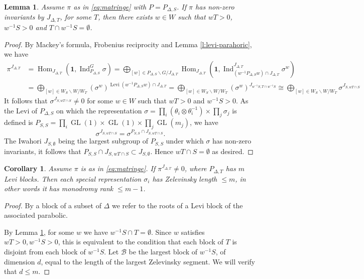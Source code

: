 \documentclass{amsart}
\newtheorem{lemma}[thm]{Lemma}
\newtheorem{corollary}[thm]{Corollary}
\theoremstyle{definition}
\newcommand{\Hom}{\operatorname{Hom}}
\newcommand{\Ind}{\operatorname{Ind}}
\newcommand{\GL}{\operatorname{GL}}
\begin{document}
{\begin{lemma}\label{l:parahoric-condition}
Assume  $\pi$ as in \eqref{eq:matringe} with $P=P_{\Delta,S}$. 
If $\pi$ has non-zero invariants by  $J_{\Delta,T}$, for some $T$, then there exists   $w\in W$ such that $w T>0$,  $w^{-1}S>0$ and
$T\cap w^{-1}S=\emptyset$.  
\end{lemma}
\begin{proof}
By Mackey's formula, Frobenius reciprocity and Lemma \ref{l:levi-parahoric}, we have 
\begin{align*}
\pi^{J_{\Delta,T}}&=\Hom_{J_{\Delta,T}}(\mathbf{1}, \Ind_{P_{\Delta,S}}^G  \sigma)=
\bigoplus_{[w]\in P_{\Delta,S}\backslash G/J_{\Delta,T}} \Hom_{J_{\Delta,T}}(\mathbf{1}, \Ind_{(w^{-1}P_{\Delta,S}w)\cap J_{\Delta,T}}^{J_{\Delta,T}}\sigma^w)\\
  &=\bigoplus_{[w]\in W_S\backslash    W/W_T}(\sigma^w)^{\operatorname{Levi}(w^{-1}P_{\Delta,S}w)\cap
    J_{\Delta,T}}=\bigoplus_{[w]\in W_S\backslash    W/W_T}(\sigma^w)^{J_{w^{-1}S,T\cap w^{-1}S}}\cong\bigoplus_{[w]\in W_S\backslash
    W/W_T}\sigma^{J_{S,w T\cap S}}
\end{align*}
It follows that $\sigma^{J_{S,w T\cap S}}\neq 0$ for some $w\in W$ such that $w T >0$ and 
$w^{-1}S>0$. As the  Levi of $P_{\Delta,S}$ on which the representation $\sigma= \prod_i (\theta_i\otimes
\theta_i^{-1})\times \prod_j \sigma_j$ is defined is $P_{S,S}= \prod_i \GL(1)\times\GL(1)\times \prod_j \GL(m_j)$, we have 
\[\sigma^{J_{S,w T\cap S}}= \sigma^{P_{S,S}\cap J_{S,w T\cap S}}.\]
 The Iwahori  $J_{S,\emptyset}$ being the largest subgroup of $P_{S,S}$  under which $\sigma$ has non-zero invariants, it follows that  
 $P_{S,S}\cap J_{S, w T\cap S}\subset J_{S,\emptyset}$. Hence  $w T\cap S=\emptyset$ as desired.
\end{proof}

\begin{corollary}\label{c:parahoric-monodromy-rank}
Assume $\pi$ is as in \eqref{eq:matringe}. If $\pi^{J_{\Delta,T}}\neq 0$, where $P_{\Delta,T}$ has $m$ Levi blocks. Then each special representation $\sigma_i$ has Zelevinsky length $\leqslant m$, in other words it has monodromy rank $\leqslant m-1$.
\end{corollary}
\begin{proof}
By a block of a subset of $\Delta$ we refer to the roots of a Levi block of the associated parabolic.

By Lemma \ref{l:parahoric-condition}, for some $w$ we have $w^{-1}S\cap T=\emptyset$. Since $w$ satisfies $w
T>0,w^{-1}S>0$, this is equivalent to the condition that each
block of $T$ is disjoint from each block of $w^{-1}S$. Let
$\mathcal{B}$ be the largest block of $w^{-1}S$, of dimension
$d$, equal to the length of the largest Zelevinsky segment. We
will verify that $d\leqslant m$.


\end{proof}}
\end{document}
